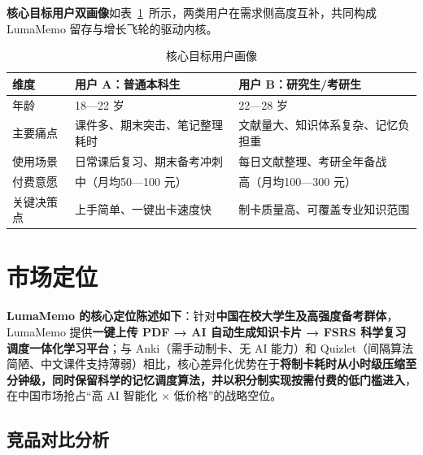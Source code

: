 \textbf{核心目标用户双画像}如表~\ref{tab:user_persona}~所示，两类用户在需求侧高度互补，共同构成 LumaMemo 留存与增长飞轮的驱动内核。

\begin{table}[htbp]
  \centering
  \caption{核心目标用户画像}
  \label{tab:user_persona}
  \begin{tabular}{p{3.0cm}p{5.0cm}p{5.0cm}}
    \toprule
    \textbf{维度} & \textbf{用户 A：普通本科生} & \textbf{用户 B：研究生/考研生} \\
    \midrule
    年龄       & 18—22 岁 & 22—28 岁 \\[2pt]
    主要痛点   & 课件多、期末突击、笔记整理耗时 & 文献量大、知识体系复杂、记忆负担重 \\[2pt]
    使用场景   & 日常课后复习、期末备考冲刺 & 每日文献整理、考研全年备战 \\[2pt]
    付费意愿   & 中（月均50—100 元） & 高（月均100—300 元） \\[2pt]
    关键决策点 & 上手简单、一键出卡速度快 & 制卡质量高、可覆盖专业知识范围 \\
    \bottomrule
  \end{tabular}
\end{table}

\section{市场定位}

\textbf{LumaMemo 的核心定位陈述如下}：针对\textbf{中国在校大学生及高强度备考群体}，LumaMemo 提供\textbf{一键上传 PDF → AI 自动生成知识卡片 → FSRS 科学复习调度一体化学习平台}；与 Anki（需手动制卡、无 AI 能力）和 Quizlet（间隔算法简陋、中文课件支持薄弱）相比，核心差异化优势在于\textbf{将制卡耗时从小时级压缩至分钟级，同时保留科学的记忆调度算法，并以积分制实现按需付费的低门槛进入}，在中国市场抢占“高 AI 智能化 × 低价格”的战略空位。

\subsection{竞品对比分析}

